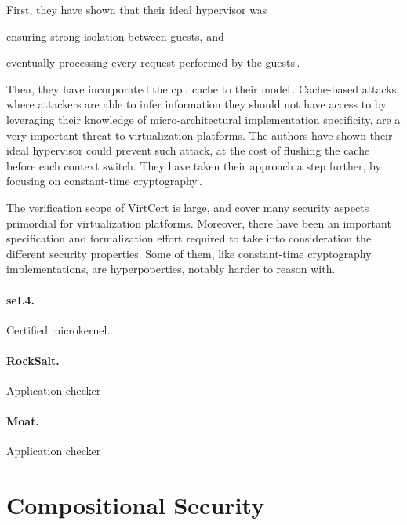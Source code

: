 First, they have shown that their ideal hypervisor was
%
\begin{inparaenum}[(1)]
\item ensuring strong isolation between guests, and
%
\item eventually processing every request performed by the
  guests\,\cite{barthe2011virtcert1}.
\end{inparaenum}
%
Then, they have incorporated the \ac{cpu} cache to their
model\,\cite{barthe2012virtcert2}.
%
Cache-based attacks, where attackers are able to infer information they should
not have access to by leveraging their knowledge of micro-architectural
implementation specificity, are a very important threat to virtualization
platforms.
%
The authors have shown their ideal hypervisor could prevent such attack, at the
cost of flushing the cache before each context switch.
%
They have taken their approach a step further, by focusing on constant-time
cryptography\,\cite{barthe2014virtcert3}.

The verification scope of VirtCert is large, and cover many security aspects
primordial for virtualization platforms.
%
Moreover, there have been an important specification and formalization effort
required to take into consideration the different security properties.
%
Some of them, like constant-time cryptography implementations, are
hyperpoperties, notably harder to reason with.

\paragraph{seL4.}
%
Certified microkernel.

\paragraph{RockSalt.}
%
Application checker

\paragraph{Moat.}
%
Application checker

\section{Compositional Security}

